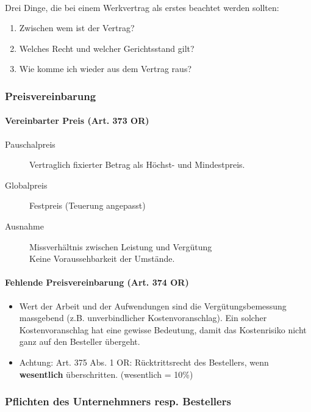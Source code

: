 \mbox{}\\
Drei Dinge, die bei einem Werkvertrag als erstes beachtet werden
sollten:
\begin{enumerate}
	\tightlist
	\item Zwischen wem ist der Vertrag?
	\item Welches Recht und welcher Gerichtsstand gilt?
	\item Wie komme ich wieder aus dem Vertrag raus?
\end{enumerate}

\subsubsection{Preisvereinbarung}
\label{sec:Werkvertrag-Preisvereinbarung}

\paragraph{Vereinbarter Preis (Art. 373 OR)}
\begin{description}
	\item[Pauschalpreis] Vertraglich fixierter Betrag als Höchst- und
	Mindestpreis.
	\item[Globalpreis] Festpreis (Teuerung angepasst)
	\item[Ausnahme] Missverhältnis zwischen Leistung und Vergütung\\
	Keine Voraussehbarkeit der Umstände.
\end{description}

\paragraph{Fehlende Preisvereinbarung (Art. 374 OR)}

\begin{itemize}
	\tightlist
	\item Wert der Arbeit und der Aufwendungen sind die Vergütungsbemessung
	massgebend (z.B. unverbindlicher Kostenvoranschlag). Ein solcher
	Kostenvoranschlag hat eine gewisse Bedeutung, damit das Kostenrisiko nicht
	ganz auf den Besteller übergeht.
	\item Achtung: Art. 375 Abs. 1 OR: Rücktrittsrecht des Bestellers, wenn
	\textbf{wesentlich} überschritten. (wesentlich = 10\%)
\end{itemize}

\subsubsection{Pflichten des Unternehmners resp. Bestellers}
\label{sec:Werkvertrag-RechtePflichten}

